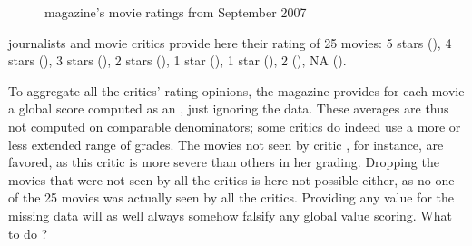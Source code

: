 \documentclass[a4paper,12pt,english]{sphinxhowto}
\let\sphinxpxdimen\pdfpxdimen\else\newdimen\sphinxpxdimen
\begin{document}
\begin{sphinxVerbatim}[commandchars=\\\{\},numbers=left,firstnumber=1,stepnumber=1]
   
  
                             
\end{sphinxVerbatim}

\begin{figure}[H]
\centering
\capstart

\noindent\sphinxincludegraphics[width=500\sphinxpxdimen]{{graffiti07_1}.png}
\caption{ magazine’s movie ratings from September 2007}\label{\detokenize{pearls:graffiti07-1}}\end{figure}

 journalists and movie critics provide here their rating of 25 movies: 5 stars (), 4 stars (), 3 stars (), 2 stars (), 1 star (), \sphinxhyphen{}1 star (), \sphinxhyphen{}2 (), NA ().

\sphinxAtStartPar
To aggregate all the critics’ rating opinions, the  magazine provides for each movie a global score computed as an , just ignoring the  data. These averages are thus not computed on comparable denominators; some critics do indeed use a more or less extended range of grades. The movies not seen by critic , for instance, are favored, as this critic is more severe than others in her grading. Dropping the movies that were not seen by all the critics is here not possible either, as no one of the 25 movies was actually seen by all the critics. Providing any value for the missing data will as well always somehow falsify any global value scoring. What to do ?
\end{document}
